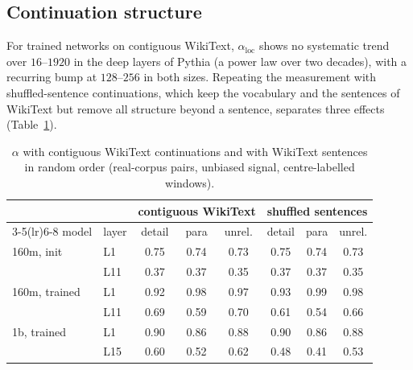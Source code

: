 \documentclass[11pt]{article}
\theoremstyle{definition}
\theoremstyle{remark}
\begin{document}
\subsection{Continuation structure}
\label{sec:results-struct}

For trained networks on contiguous WikiText, $\alpha_{\mathrm{loc}}$ shows no systematic trend over $16$--$1920$ in the deep layers of Pythia (a power law over two decades), with a recurring bump at $128$--$256$ in both sizes. Repeating the measurement with shuffled-sentence continuations, which keep the vocabulary and the sentences of WikiText but remove all structure beyond a sentence, separates three effects (Table~\ref{tab:shuffled}).

\begin{table}[t]
\centering\small
\begin{tabular}{llcccccc}
\toprule
 & & \multicolumn{3}{c}{contiguous WikiText} & \multicolumn{3}{c}{shuffled sentences} \\
\cmidrule(lr){3-5}\cmidrule(lr){6-8}
model & layer & detail & para & unrel. & detail & para & unrel. \\
\midrule
160m, init    & L1  & 0.75 & 0.74 & 0.73 & 0.75 & 0.74 & 0.73 \\
              & L11 & 0.37 & 0.37 & 0.35 & 0.37 & 0.37 & 0.35 \\
160m, trained & L1  & 0.92 & 0.98 & 0.97 & 0.93 & 0.99 & 0.98 \\
              & L11 & 0.69 & 0.59 & 0.70 & 0.61 & 0.54 & 0.66 \\
1b, trained   & L1  & 0.90 & 0.86 & 0.88 & 0.90 & 0.86 & 0.88 \\
              & L15 & 0.60 & 0.52 & 0.62 & 0.48 & 0.41 & 0.53 \\
\bottomrule
\end{tabular}
\caption{$\alpha$ with contiguous WikiText continuations and with WikiText sentences in random order (real-corpus pairs, unbiased signal, centre-labelled windows).}
\label{tab:shuffled}
\end{table}
\end{document}
